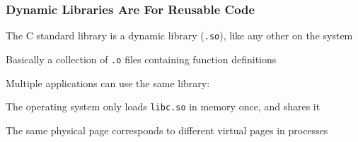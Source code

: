   \begin{frame}
    \frametitle{Dynamic Libraries Are For Reusable Code}

    The C standard library is a dynamic library (\texttt{.so}), like any other
    on the system

    \hspace{1em} Basically a collection of \texttt{.o} files containing function
    definitions

    \vspace{1em}

    Multiple applications can use the same library:

    \vspace{1em}


    \vspace{1em}

    The operating system only loads \texttt{libc.so} in memory once, and shares
    it

    \hspace{1em} The same physical page corresponds to different virtual pages
    in processes
  \end{frame}

